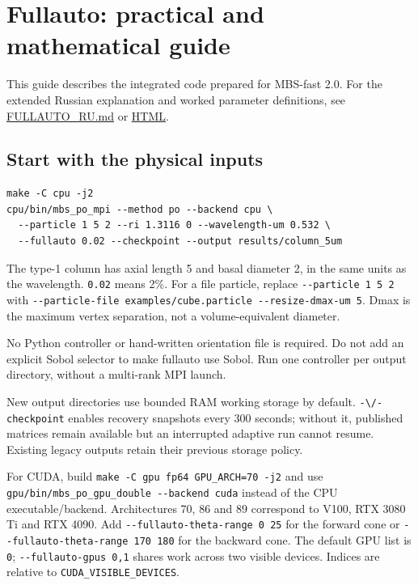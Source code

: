 \section{Fullauto: practical and mathematical
guide}\label{fullauto-practical-and-mathematical-guide}

This guide describes the integrated code prepared for MBS-fast 2.0. For
the extended Russian explanation and worked parameter definitions, see
\url{FULLAUTO_RU.md} or \href{FULLAUTO_ADAPTIVE_RU.html}{HTML}.

\subsection{Start with the physical
inputs}\label{start-with-the-physical-inputs}

\noindent\begin{minipage}{\linewidth}
\begin{verbatim}
make -C cpu -j2
cpu/bin/mbs_po_mpi --method po --backend cpu \
  --particle 1 5 2 --ri 1.3116 0 --wavelength-um 0.532 \
  --fullauto 0.02 --checkpoint --output results/column_5um
\end{verbatim}
\end{minipage}

The type-1 column has axial length 5 and basal diameter 2, in the same
units as the wavelength. \texttt{0.02} means 2\%. For a file particle,
replace \texttt{-\/-particle\ 1\ 5\ 2} with
\texttt{-\/-particle-file\ examples/cube.particle\ -\/-resize-dmax-um\ 5}.
Dmax is the maximum vertex separation, not a volume-equivalent diameter.

No Python controller or hand-written orientation file is required. Do
not add an explicit Sobol selector to make fullauto use Sobol. Run one
controller per output directory, without a multi-rank MPI launch.

New output directories use bounded RAM working storage by default.
\nolinkurl{-\/-checkpoint} enables recovery snapshots every 300 seconds;
without it, published matrices remain available but an interrupted
adaptive run cannot resume. Existing legacy outputs retain their
previous storage policy.

For CUDA, build \texttt{make\ -C\ gpu\ fp64\ GPU\_ARCH=70\ -j2} and use
\texttt{gpu/bin/mbs\_po\_gpu\_double\ -\/-backend\ cuda} instead of the
CPU executable/backend. Architectures 70, 86 and 89 correspond to V100,
RTX 3080 Ti and RTX 4090. Add \texttt{-\/-fullauto-theta-range\ 0\ 25}
for the forward cone or \texttt{-\/-fullauto-theta-range\ 170\ 180} for
the backward cone. The default GPU list is \texttt{0};
\texttt{-\/-fullauto-gpus\ 0,1} shares work across two visible devices.
Indices are relative to \nolinkurl{CUDA_VISIBLE_DEVICES}.

